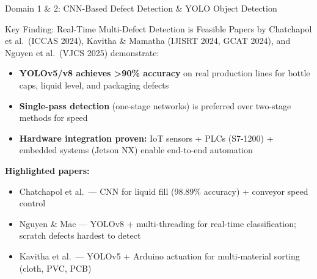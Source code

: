 \documentclass[10pt]{beamer}
\begin{document}
\begin{frame}{Domain 1 \& 2: CNN-Based Defect Detection \& YOLO Object Detection}

\small
\begin{block}{Key Finding: Real-Time Multi-Defect Detection is Feasible}
Papers by Chatchapol et al.\ (ICCAS 2024), Kavitha \& Mamatha (IJISRT 2024, GCAT 2024), and Nguyen et al.\ (VJCS 2025) demonstrate:
\begin{itemize}\setlength{\itemsep}{3pt}
    \item \textbf{YOLOv5/v8 achieves >90\% accuracy} on real production lines for bottle caps, liquid level, and packaging defects
    \item \textbf{Single-pass detection} (one-stage networks) is preferred over two-stage methods for speed
    \item \textbf{Hardware integration proven:} IoT sensors + PLCs (S7-1200) + embedded systems (Jetson NX) enable end-to-end automation
\end{itemize}
\end{block}

\vspace{6pt}
\textbf{Highlighted papers:}
\begin{itemize}\setlength{\itemsep}{2pt}
    \item Chatchapol et al.\ — CNN for liquid fill (98.89\% accuracy) + conveyor speed control
    \item Nguyen \& Mac — YOLOv8 + multi-threading for real-time classification; scratch defects hardest to detect
    \item Kavitha et al.\ — YOLOv5 + Arduino actuation for multi-material sorting (cloth, PVC, PCB)
\end{itemize}

\end{frame}
\end{document}
